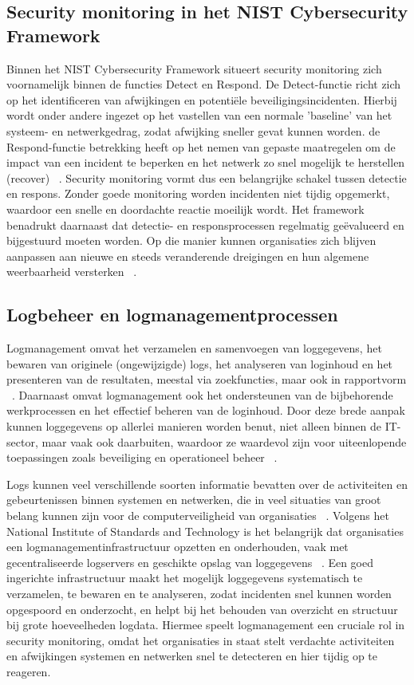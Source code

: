 \subsection{Security monitoring in het NIST Cybersecurity Framework}
Binnen het NIST Cybersecurity Framework situeert security monitoring zich voornamelijk binnen de functies Detect en Respond. De Detect-functie richt zich op het identificeren van afwijkingen en potentiële beveiligingsincidenten. Hierbij wordt onder andere ingezet op het vastellen van een normale 'baseline' van het systeem- en netwerkgedrag, zodat afwijking sneller gevat kunnen worden. de Respond-functie betrekking heeft op het nemen van gepaste maatregelen om de impact van een incident te beperken en het netwerk zo snel mogelijk te herstellen (recover) ~\autocite{NIST_CSF_2018}. Security monitoring vormt dus een belangrijke schakel tussen detectie en respons. Zonder goede monitoring worden incidenten niet tijdig opgemerkt, waardoor een snelle en doordachte reactie moeilijk wordt. Het framework benadrukt daarnaast dat detectie- en responsprocessen regelmatig geëvalueerd en bijgestuurd moeten worden. Op die manier kunnen organisaties zich blijven aanpassen aan nieuwe en steeds veranderende dreigingen en hun algemene weerbaarheid versterken ~\autocite{NIST_CSF_2018}.

\subsection{Logbeheer en logmanagementprocessen}
Logmanagement omvat het verzamelen en samenvoegen van loggegevens, het bewaren van originele (ongewijzigde) logs, het analyseren van loginhoud en het presenteren van de resultaten, meestal via zoekfuncties, maar ook in rapportvorm ~\autocite{chuvakin2010complete}. Daarnaast omvat logmanagement ook het ondersteunen van de bijbehorende werkprocessen en het effectief beheren van de loginhoud. Door deze brede aanpak kunnen loggegevens op allerlei manieren worden benut, niet alleen binnen de IT-sector, maar vaak ook daarbuiten, waardoor ze waardevol zijn voor uiteenlopende toepassingen zoals beveiliging en operationeel beheer ~\autocite{chuvakin2010complete}. 

Logs kunnen veel verschillende soorten informatie bevatten over de activiteiten en gebeurtenissen binnen systemen en netwerken, die in veel situaties van groot belang kunnen zijn voor de computerveiligheid van organisaties ~\autocite{NIST_logs_2006}. Volgens het National Institute of Standards and Technology is het belangrijk dat organisaties een logmanagementinfrastructuur opzetten en onderhouden, vaak met gecentraliseerde logservers en geschikte opslag van loggegevens ~\autocite{NIST_logs_2006}. Een goed ingerichte infrastructuur maakt het mogelijk loggegevens systematisch te verzamelen, te bewaren en te analyseren, zodat incidenten snel kunnen worden opgespoord en onderzocht, en helpt bij het behouden van overzicht en structuur bij grote hoeveelheden logdata. Hiermee speelt logmanagement een cruciale rol in security monitoring, omdat het organisaties in staat stelt verdachte activiteiten en afwijkingen  systemen en netwerken snel te detecteren en hier tijdig op te reageren.

